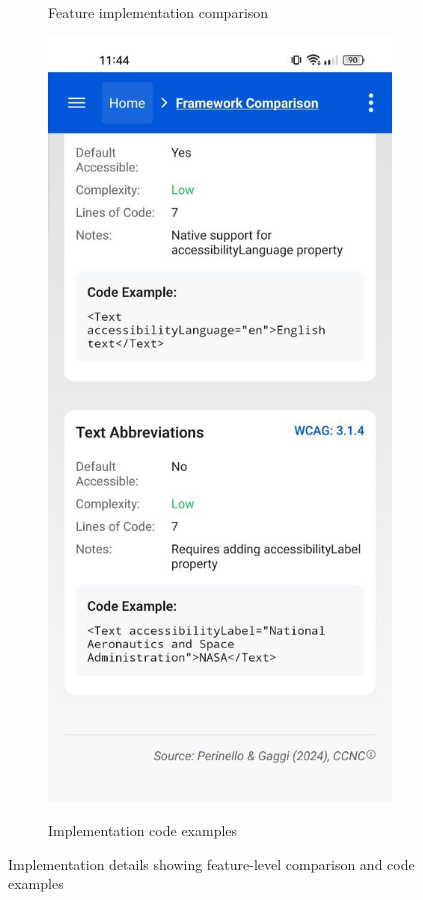 \begin{figure}[ht]
\begin{subfigure}[b]{0.48\textwidth}
        \caption{Feature implementation comparison}
        \label{fig:implementation-feature-comparison}
    \end{subfigure}
    \hfill
    \begin{subfigure}[b]{0.48\textwidth}
        \centering
        \includegraphics[width=\linewidth, alt={Implementation Details tab showing code examples}]{img/implementation1.jpg}
        \caption{Implementation code examples}
        \label{fig:implementation-code-examples}
    \end{subfigure}
    \caption{Implementation details showing feature-level comparison and code examples}
    \label{fig:implementation_details}
\end{figure}

